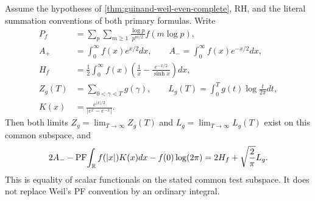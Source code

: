 \begin{theorem}
\label{thm:guinand-weil-residual-complete}
Assume the hypotheses of \cref{thm:guinand-weil-even-complete}, RH, and the
literal summation conventions of both primary formulas.  Write
\begin{align*}
 P_f&=\sum_p\sum_{m\geq1}\frac{\log p}{p^{m/2}}f(m\log p),\\
 A_+&=\int_0^\infty f(x)e^{x/2}dx,\qquad
 A_-=\int_0^\infty f(x)e^{-x/2}dx,\\
 H_f&=\frac12\int_0^\infty f(x)
 \left(\frac1x-\frac{e^{-x/2}}{\sinh x}\right)dx,\\
 Z_g(T)&=\sum_{0<\gamma<T}g(\gamma),\qquad
 L_g(T)=\int_0^Tg(t)\log\frac{t}{2\pi}dt,\\
 K(x)&=\frac{e^{|x|/2}}{|e^x-e^{-x}|}.
\end{align*}
Then both limits $Z_g=\lim_{T\to\infty}Z_g(T)$ and
$L_g=\lim_{T\to\infty}L_g(T)$ exist on this common subspace, and
\begin{equation}
 2A_--\operatorname{PF}\!\int_\mathbb R f(|x|)K(x)dx
 -f(0)\log(2\pi)
 =2H_f+\sqrt{\frac2\pi}L_g.
 \label{eq:guinand-weil-residual-complete}
\end{equation}
This is equality of scalar functionals on the stated common test subspace.  It
does not replace Weil's PF convention by an ordinary integral.
\end{theorem}

